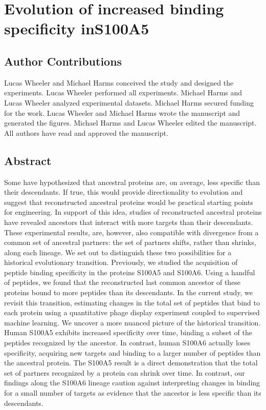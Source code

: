 \chapter{Evolution of increased binding specificity in\newline S100A5}

\section{Author Contributions}
Lucas Wheeler and Michael Harms conceived the study and designed the experiments. Lucas Wheeler performed all experiments. Michael Harms and Lucas Wheeler analyzed experimental datasets. Michael Harms secured funding for the work. Lucas Wheeler and Michael Harms wrote the manuscript and generated the figures. Michael Harms and Lucas Wheeler edited the manuscript. All authors have read and approved the manuscript. 

\section{Abstract}
Some have hypothesized that ancestral proteins are, on average, less
specific than their descendants. If true, this would provide directionality
to evolution and suggest that reconstructed ancestral proteins would
be practical starting points for engineering. In support of this idea,
studies of reconstructed ancestral proteins have revealed ancestors
that interact with more targets than their descendants. These experimental
results, are, however, also compatible with divergence from a common
set of ancestral partners: the set of partners shifts, rather than
shrinks, along each lineage. We set out to distinguish these two possibilities
for a historical evolutionary transition. Previously, we studied the
acquisition of peptide binding specificity in the proteins S100A5
and S100A6. Using a handful of peptides, we found that the reconstructed
last common ancestor of these proteins bound to more peptides than
its descendants. In the current study, we revisit this transition,
estimating changes in the total set of peptides that bind to each
protein using a quantitative phage display experiment coupled to supervised
machine learning. We uncover a more nuanced picture of the historical
transition. Human S100A5 exhibits increased specificity over time,
binding a subset of the peptides recognized by the ancestor. In contrast,
human S100A6 actually loses specificity, acquiring new targets and
binding to a larger number of peptides than the ancestral protein.
 The S100A5 result is a direct demonstration that the total set of
partners recognized by a protein can shrink over time. In contrast,
our findings along the S100A6 lineage caution against interpreting
changes in binding for a small number of targets as evidence that
the ancestor is less specific than its descendants. 

